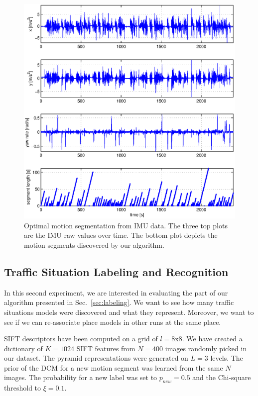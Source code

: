 \begin{figure}[t]
\centering
\includegraphics[width=\columnwidth]{fig/cpResult.eps}
\caption{Optimal motion segmentation from IMU data. The three top plots are the
IMU raw values over time. The bottom plot depicts the motion segments
discovered by our algorithm.}
\label{fig:motion_segments}
\end{figure}

\subsection{Traffic Situation Labeling and Recognition}
In this second experiment, we are interested in evaluating the part of our
algorithm presented in Sec.~\ref{sec:labeling}. We want to see how many traffic
situations models were discovered and what they represent. Moreover, we want
to see if we can re-associate place models in other runs at the same place.

SIFT descriptors have been computed on a grid of $l=8$x$8$. We have created a
dictionary of $K=1024$ SIFT features from $N=400$ images randomly picked in our
dataset. The pyramid representations were generated on $L=3$ levels. The prior
of the DCM for a new motion segment was learned from the same $N$ images. The
probability for a new label was set to $p_{new}=0.5$ and the Chi-square
threshold to $\xi=0.1$.
